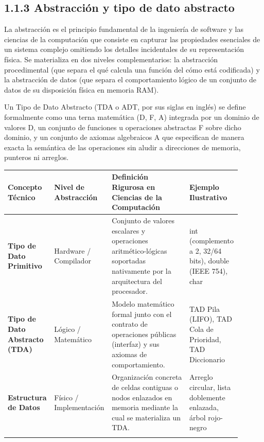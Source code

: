 \documentclass[11pt,letterpaper]{article}
\begin{document}
\subsection*{1.1.3 Abstracción y tipo de dato abstracto}
La abstracción es el principio fundamental de la ingeniería de software y las ciencias de la computación que consiste en capturar las propiedades esenciales de un sistema complejo omitiendo los detalles incidentales de su representación física. Se materializa en dos niveles complementarios: la abstracción procedimental (que separa el qué calcula una función del cómo está codificada) y la abstracción de datos (que separa el comportamiento lógico de un conjunto de datos de su disposición física en memoria RAM).\par
Un Tipo de Dato Abstracto (TDA o ADT, por sus siglas en inglés) se define formalmente como una terna matemática (D, F, A) integrada por un dominio de valores D, un conjunto de funciones u operaciones abstractas F sobre dicho dominio, y un conjunto de axiomas algebraicos A que especifican de manera exacta la semántica de las operaciones sin aludir a direcciones de memoria, punteros ni arreglos.\par
\vspace{4pt}\noindent
\begin{tabular}{>{\raggedright\arraybackslash}p{0.194\linewidth}>{\raggedright\arraybackslash}p{0.180\linewidth}>{\raggedright\arraybackslash}p{0.332\linewidth}>{\raggedright\arraybackslash}p{0.194\linewidth}}
\toprule
\textbf{\color{ipnguinda}Concepto Técnico} & \textbf{\color{ipnguinda}Nivel de Abstracción} & \textbf{\color{ipnguinda}Definición Rigurosa en Ciencias de la Computación} & \textbf{\color{ipnguinda}Ejemplo Ilustrativo} \\
\midrule
\textbf{Tipo de Dato Primitivo} & Hardware / Compilador & Conjunto de valores escalares y operaciones aritmético-lógicas soportadas nativamente por la arquitectura del procesador. & int (complemento a 2, 32/64 bits), double (IEEE 754), char \\
\addlinespace[3pt]
\textbf{Tipo de Dato Abstracto (TDA)} & Lógico / Matemático & Modelo matemático formal junto con el contrato de operaciones públicas (interfaz) y sus axiomas de comportamiento. & TAD Pila (LIFO), TAD Cola de Prioridad, TAD Diccionario \\
\addlinespace[3pt]
\textbf{Estructura de Datos} & Físico / Implementación & Organización concreta de celdas contiguas o nodos enlazados en memoria mediante la cual se materializa un TDA. & Arreglo circular, lista doblemente enlazada, árbol rojo-negro \\
\addlinespace[3pt]
\bottomrule
\end{tabular}
\end{document}
